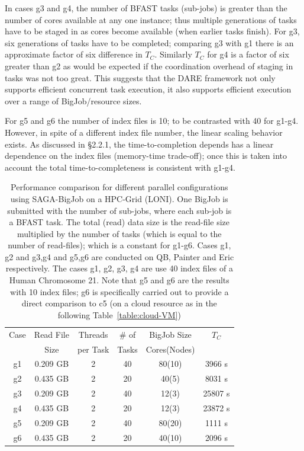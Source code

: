 \documentclass{cpeauth}
\begin{document}
In cases g3 and g4, the number of BFAST tasks (sub-jobs) is greater
than the number of cores available at any one instance; thus multiple
generations of tasks have to be staged in as cores become available
(when earlier tasks finish).  For g3, six generations of tasks have to
be completed; comparing g3 with g1 there is an approximate factor of
six difference in $T_C$. Similarly $T_C$ for g4 is a factor of six
greater than g2 as would be expected if the coordination overhead of
staging in tasks was not too great. This suggests that the DARE
framework not only supports efficient concurrent task execution, it
also supports efficient execution over a range of BigJob/resource
sizes.

For g5 and g6 the number of index files is 10; to be contrasted with
40 for g1-g4.  However, in spite of a different index file number, the
linear scaling behavior exists.  As discussed in \S 2.2.1, the
time-to-completion depends has a linear dependence on the index files
(memory-time trade-off); once this is taken into account the total
time-to-completeness is consistent with g1-g4.


 \begin{table}
 \small
 \begin{tabular}{|c|c|c|c|c|c|} 
 \hline 
Case & Read File & Threads   &  \# of & BigJob Size   &   $T_C$   \\
   & Size& per Task & Tasks  & Cores(Nodes)  & \\
   \hline
g1 & 0.209 GB & 2 &   40 &  80(10) & 3966 s \\
g2 & 0.435 GB & 2 &  20 & 40(5) & 8031 s\\ \hline
g3  & 0.209 GB& 2 & 40  & 12(3) & 25807 s \\
g4 & 0.435 GB& 2 & 20  & 12(3) & 23872 s  \\ \hline
\hline
g5 & 0.209 GB& 2& 40 & 80(20) & 1111 s \\
g6&0.435 GB&2& 20 & 40(10)&2096 s\\
\hline
\end{tabular}
\caption{Performance comparison for different parallel configurations
  using SAGA-BigJob on a HPC-Grid (LONI). One BigJob is submitted with
  the number of sub-jobs, where each sub-job is a BFAST task.  The
  total (read) data size is the read-file size multiplied by the
  number of tasks (which is equal to the number of read-files); which
  is a constant for g1-g6.  Cases g1, g2 and g3,g4 and g5,g6 are
  conducted on QB, Painter and Eric respectively. The cases g1, g2,
  g3, g4 are use 40 index files of a Human Chromosome 21.  Note that
  g5 and g6 are the results with 10 index files; g6 is specifically
  carried out to provide a direct comparison to c5 (on a cloud
  resource as in the following Table~\ref{table:cloud-VM}) }
  
  \label{table:bigjob-loni} 
\end{table}
\end{document}
